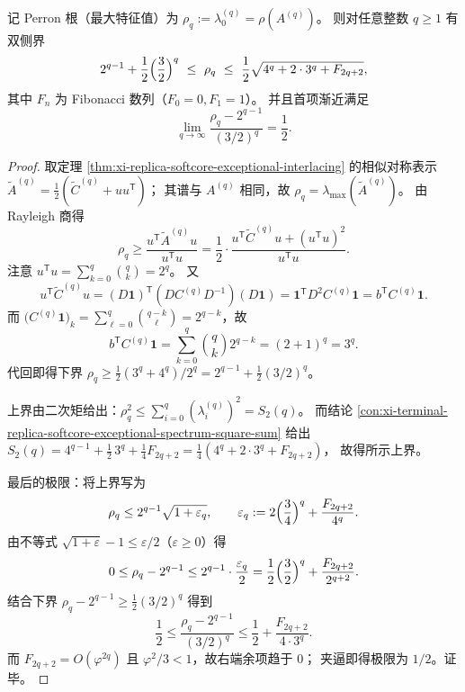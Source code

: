 \begin{theorem}\label{thm:xi-replica-softcore-perron-leading-term-bounds}
记 Perron 根（最大特征值）为 \(\rho_q:=\lambda_0^{(q)}=\rho(A^{(q)})\)。
则对任意整数 \(q\ge 1\) 有双侧界
\[
2^{q-1}+\frac12\Bigl(\frac32\Bigr)^{q}
\ \le\ \rho_q\ \le\
\frac12\sqrt{4^{q}+2\cdot 3^{q}+F_{2q+2}},
\]
其中 \(F_n\) 为 Fibonacci 数列（\(F_0=0,F_1=1\)）。
并且首项渐近满足
\[
\lim_{q\to\infty}\frac{\rho_q-2^{q-1}}{(3/2)^q}=\frac12.
\]
\end{theorem}
\begin{proof}
取定理 \ref{thm:xi-replica-softcore-exceptional-interlacing} 的相似对称表示
\(
\widetilde A^{(q)}=\frac12(\widetilde C^{(q)}+uu^{\mathsf T})
\)；
其谱与 \(A^{(q)}\) 相同，故 \(\rho_q=\lambda_{\max}(\widetilde A^{(q)})\)。
由 Rayleigh 商得
\[
\rho_q\ge \frac{u^{\mathsf T}\widetilde A^{(q)}u}{u^{\mathsf T}u}
=\frac12\cdot\frac{u^{\mathsf T}\widetilde C^{(q)}u+(u^{\mathsf T}u)^2}{u^{\mathsf T}u}.
\]
注意 \(u^{\mathsf T}u=\sum_{k=0}^{q}\binom{q}{k}=2^{q}\)。
又
\[
u^{\mathsf T}\widetilde C^{(q)}u
=(D\mathbf{1})^{\mathsf T}(DC^{(q)}D^{-1})(D\mathbf{1})
=\mathbf{1}^{\mathsf T}D^{2}C^{(q)}\mathbf{1}
=b^{\mathsf T}C^{(q)}\mathbf{1}.
\]
而 \(\bigl(C^{(q)}\mathbf{1}\bigr)_k=\sum_{\ell=0}^{q}\binom{q-k}{\ell}=2^{q-k}\)，故
\[
b^{\mathsf T}C^{(q)}\mathbf{1}
=\sum_{k=0}^{q}\binom{q}{k}2^{q-k}=(2+1)^{q}=3^{q}.
\]
代回即得下界
\(
\rho_q\ge \frac12(3^{q}+4^{q})/2^{q}=2^{q-1}+\frac12(3/2)^q
\)。
\par
上界由二次矩给出：\(\rho_q^2\le \sum_{i=0}^{q}(\lambda_i^{(q)})^2=S_2(q)\)。
而结论 \ref{con:xi-terminal-replica-softcore-exceptional-spectrum-square-sum} 给出
\(
S_2(q)=4^{q-1}+\frac12\,3^{q}+\frac14F_{2q+2}
=\frac14(4^{q}+2\cdot 3^{q}+F_{2q+2})
\)，
故得所示上界。
\par
最后的极限：将上界写为
\[
\rho_q\le 2^{q-1}\sqrt{1+\varepsilon_q},
\qquad
\varepsilon_q:=2\Bigl(\frac34\Bigr)^{q}+\frac{F_{2q+2}}{4^{q}}.
\]
由不等式 \(\sqrt{1+\varepsilon}-1\le \varepsilon/2\)（\(\varepsilon\ge 0\)）得
\[
0\le \rho_q-2^{q-1}
\le
2^{q-1}\cdot\frac{\varepsilon_q}{2}
=\frac12\Bigl(\frac32\Bigr)^{q}+\frac{F_{2q+2}}{2^{q+2}}.
\]
结合下界
\(
\rho_q-2^{q-1}\ge \frac12(3/2)^q
\)
得到
\[
\frac12
\le
\frac{\rho_q-2^{q-1}}{(3/2)^q}
\le
\frac12+\frac{F_{2q+2}}{4\cdot 3^q}.
\]
而 \(F_{2q+2}=O(\varphi^{2q})\) 且 \(\varphi^2/3<1\)，故右端余项趋于 \(0\)；
夹逼即得极限为 \(1/2\)。证毕。
\end{proof}

\endinput

